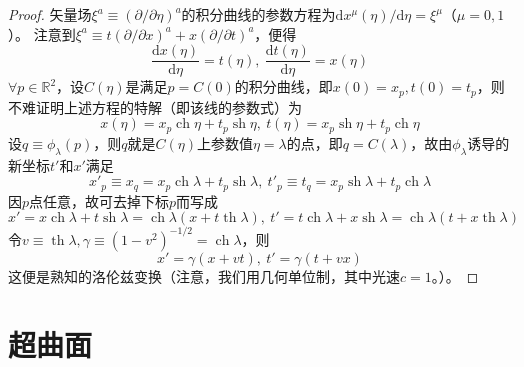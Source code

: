 \begin{proof}
矢量场$\xi^a \equiv (\partial / \partial\eta)^a$的积分曲线的参数方程为$\mathrm{d}x^\mu(\eta) / \mathrm{d}\eta = \xi^\mu$（$\mu = 0, 1$）。
注意到$\xi^a \equiv t(\partial / \partial x)^a + x(\partial / \partial t)^a$，便得
$$\frac{\mathrm{d}x(\eta)}{\mathrm{d}\eta} = t(\eta), ~ \frac{\mathrm{d}t(\eta)}{\mathrm{d}\eta} = x(\eta)$$
$\forall p \in \mathbb{R}^2$，设$C(\eta)$是满足$p = C(0)$的积分曲线，即$x(0) = x_p, t(0) = t_p$，则不难证明上述方程的特解（即该线的参数式）为
$$x(\eta) = x_p\operatorname{ch}\eta + t_p\operatorname{sh}\eta, ~ t(\eta) = x_p\operatorname{sh}\eta + t_p\operatorname{ch}\eta$$
设$q \equiv \phi_\lambda(p)$，则$q$就是$C(\eta)$上参数值$\eta = \lambda$的点，即$q = C(\lambda)$，故由$\phi_\lambda$诱导的新坐标$t'$和$x'$满足
$$x'_p \equiv x_q = x_p\operatorname{ch}\lambda + t_p\operatorname{sh}\lambda, ~ t'_p \equiv t_q = x_p\operatorname{sh}\lambda + t_p\operatorname{ch}\lambda$$
因$p$点任意，故可去掉下标$p$而写成
$$x' = x\operatorname{ch}\lambda + t\operatorname{sh}\lambda = \operatorname{ch}\lambda(x + t\operatorname{th}\lambda), ~ t' = t\operatorname{ch}\lambda + x\operatorname{sh}\lambda = \operatorname{ch}\lambda(t + x\operatorname{th}\lambda)$$
令$v \equiv \operatorname{th}\lambda, \gamma \equiv (1 - v^2)^{-1/2} = \operatorname{ch}\lambda$，则
$$x' = \gamma(x + vt), ~ t'= \gamma(t + vx)$$
这便是熟知的洛伦兹变换（注意，我们用几何单位制，其中光速$c = 1$。）。
\end{proof}

\section{超曲面}
